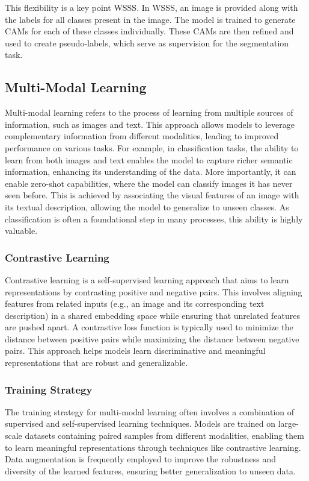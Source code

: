 This flexibility is a key point WSSS. In WSSS, an image is provided along with the labels for all classes present in the image. The model is trained to generate CAMs for each of these classes individually. These CAMs are then refined and used to create pseudo-labels, which serve as supervision for the segmentation task.

\subsection{Multi-Modal Learning}
\label{subsec:multi_modal_learning}
Multi-modal learning refers to the process of learning from multiple sources of information, such as images and text. This approach allows models to leverage complementary information from different modalities, leading to improved performance on various tasks. For example, in classification tasks, the ability to learn from both images and text enables the model to capture richer semantic information, enhancing its understanding of the data. More importantly, it can enable zero-shot capabilities, where the model can classify images it has never seen before. This is achieved by associating the visual features of an image with its textual description, allowing the model to generalize to unseen classes. As classification is often a foundational step in many processes, this ability is highly valuable.

\subsubsection{Contrastive Learning}
\label{subsec:contrastive_learning}
Contrastive learning is a self-supervised learning approach that aims to learn representations by contrasting positive and negative pairs. This involves aligning features from related inputs (e.g., an image and its corresponding text description) in a shared embedding space while ensuring that unrelated features are pushed apart. A contrastive loss function is typically used to minimize the distance between positive pairs while maximizing the distance between negative pairs. This approach helps models learn discriminative and meaningful representations that are robust and generalizable.

\subsubsection{Training Strategy}
\label{subsec:training_strategy}
The training strategy for multi-modal learning often involves a combination of supervised and self-supervised learning techniques. Models are trained on large-scale datasets containing paired samples from different modalities, enabling them to learn meaningful representations through techniques like contrastive learning. Data augmentation is frequently employed to improve the robustness and diversity of the learned features, ensuring better generalization to unseen data.

